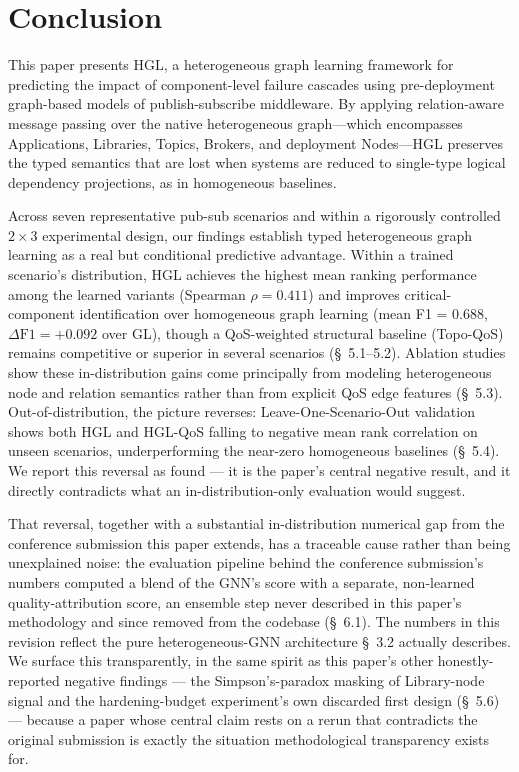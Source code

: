 \documentclass[review]{elsarticle}
\begin{document}
\section{Conclusion}

This paper presents HGL, a heterogeneous graph learning framework for predicting the impact of
component-level failure cascades using pre-deployment graph-based models of publish-subscribe
middleware. By applying relation-aware message passing over the native heterogeneous graph---which
encompasses Applications, Libraries, Topics, Brokers, and deployment Nodes---HGL preserves the
typed semantics that are lost when systems are reduced to single-type logical dependency
projections, as in homogeneous baselines.

Across seven representative pub-sub scenarios and within a rigorously controlled $2\times3$
experimental design, our findings establish typed heterogeneous graph learning as a real but
conditional predictive advantage. Within a trained scenario's distribution, HGL achieves the
highest mean ranking performance among the learned variants (Spearman $\rho=0.411$) and improves
critical-component identification over homogeneous graph learning (mean F1 = 0.688,
$\Delta\text{F1}=+0.092$ over GL), though a QoS-weighted structural baseline (Topo-QoS) remains
competitive or superior in several scenarios (\S~5.1--5.2). Ablation studies show these
in-distribution gains come principally from modeling heterogeneous node and relation semantics
rather than from explicit QoS edge features (\S~5.3). Out-of-distribution, the picture reverses:
Leave-One-Scenario-Out validation shows both HGL and HGL-QoS falling to negative mean rank
correlation on unseen scenarios, underperforming the near-zero homogeneous baselines (\S~5.4). We
report this reversal as found --- it is the paper's central negative result, and it directly
contradicts what an in-distribution-only evaluation would suggest.

That reversal, together with a substantial in-distribution numerical gap from the conference
submission this paper extends, has a traceable cause rather than being unexplained noise: the
evaluation pipeline behind the conference submission's numbers computed a blend of the GNN's score
with a separate, non-learned quality-attribution score, an ensemble step never described in this
paper's methodology and since removed from the codebase (\S~6.1). The numbers in this revision
reflect the pure heterogeneous-GNN architecture \S~3.2 actually describes. We surface this
transparently, in the same spirit as this paper's other honestly-reported negative findings --- the
Simpson's-paradox masking of Library-node signal \cite{Simpson1951,Bickel1975} and the
hardening-budget experiment's own discarded first design (\S~5.6) --- because a paper whose central
claim rests on a rerun that contradicts the original submission is exactly the situation
methodological transparency exists for.
\end{document}
